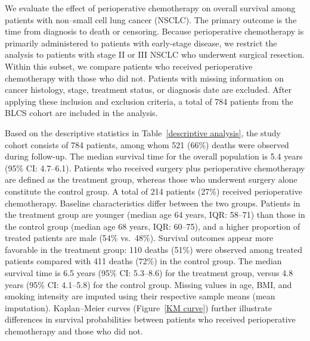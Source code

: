 \documentclass{article}
\begin{document}
{ We evaluate the effect of perioperative chemotherapy on overall survival among patients with non–small cell lung cancer (NSCLC). The primary outcome is the time from diagnosis to death or censoring. Because perioperative chemotherapy is primarily administered to patients with early-stage disease, we restrict the analysis to patients with stage II or III NSCLC who underwent surgical resection. Within this subset, we compare patients who received perioperative chemotherapy with those who did not. Patients with missing information on cancer histology, stage, treatment status, or diagnosis date are excluded. After applying these inclusion and exclusion criteria, a total of 784 patients from the BLCS cohort are included in the analysis.}

 Based on the descriptive statistics in Table~\ref{descriptive analysis}, the study cohort consists of 784 patients, among whom 521 (66\%) deaths were observed during follow-up. The median survival time for the overall population is 5.4 years (95\% CI: 4.7--6.1).
Patients who received surgery plus perioperative chemotherapy are defined as the treatment group, whereas those who underwent surgery alone constitute the control group. A total of 214 patients (27\%) received perioperative chemotherapy.
Baseline characteristics differ between the two groups. Patients in the treatment group are younger (median age 64 years, IQR: 58--71) than those in the control group (median age 68 years, IQR: 60--75), and a higher proportion of treated patients are male (54\% vs.\ 48\%).
Survival outcomes appear more favorable in the treatment group: 110 deaths (51\%) were observed among treated patients compared with 411 deaths (72\%) in the control group. The median survival time is 6.5 years (95\% CI: 5.3--8.6) for the treatment group, versus 4.8 years (95\% CI: 4.1--5.8) for the control group.
{ Missing values in age, BMI, and smoking intensity are imputed using their respective sample means (mean imputation).}  Kaplan--Meier curves (Figure~\ref{KM curve}) further illustrate differences in survival probabilities between patients who received perioperative chemotherapy and those who did not.
\end{document}
